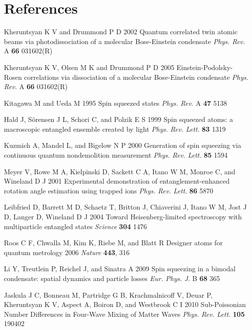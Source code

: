\documentclass{iopart}
\begin{document}
\section*{References}
\begin{thebibliography}{10}
 Kheruntsyan K V and Drummond P D 2002 Quantum correlated twin atomic beams via photodissociation of a molecular Bose-Einstein condensate \emph {Phys. Rev.} A {\bf 66} 031602(R)

 Kheruntsyan K V, Olsen M K and Drummond P D 2005 Einstein-Podolsky-Rosen correlations via dissociation of a molecular Bose-Einstein condensate \emph{Phys. Rev.} A {\bf 66} 031602(R)

 Kitagawa M and Ueda M 1995 Spin squeezed states \emph{Phys. Rev.} A {\bf 47} 5138

 Hald J, S{\"{o}}rensen J L, Schori C, and Polzik E S 1999 Spin squeezed atoms: a macroscopic entangled ensemble created by light \emph{Phys. Rev. Lett.} {\bf 83} 1319

 Kuzmich A, Mandel L, and Bigelow N P 2000 Generation of spin squeezing via
continuous quantum nondemolition measurement \emph{Phys. Rev. Lett.} {\bf 85} 1594 

 Meyer V, Rowe M A, Kielpinski D, Sackett C A, Itano W M, Monroe C, and Wineland D J 2001 Experimental demonstration of entanglement-enhanced rotation angle estimation using trapped ions \emph{Phys. Rev. Lett.} {\bf 86} 5870

 Leibfried D, Barrett M D, Schaetz T, Britton J, Chiaverini J, Itano W M, Jost J D, Langer D, Wineland D J 2004 Toward Heisenberg-limited spectroscopy with multiparticle entangled states \emph{Science} {\bf 304} 1476

 Roos C F, Chwalla M, Kim K, Riebe M, and Blatt R Designer atoms for
quantum metrology 2006 \emph{Nature} {\bf 443}, 316

 Li Y, Treutlein P, Reichel J, and Sinatra A 2009 Spin squeezing in a bimodal condensate: spatial dynamics and particle losses \emph{Eur. Phys. J.} B {\bf 68} 365

 Jaskula J C, Bonneau M, Partridge G B, Krachmalnicoff V, Deuar P, Kheruntsyan K V, Aspect A, Boiron D, and Westbrook C I 2010 Sub-Poissonian Number Differences in Four-Wave Mixing of Matter Waves \emph{Phys. Rev. Lett.} {\bf 105} 190402


\end{thebibliography}
\end{document}
